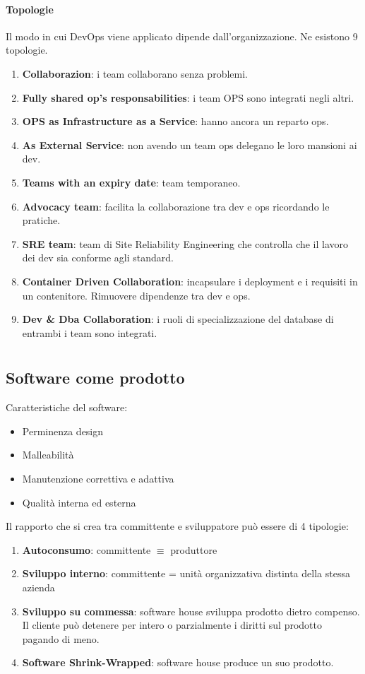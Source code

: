 \documentclass{report}
\begin{document}
\subsubsection*{Topologie}
Il modo in cui DevOps viene applicato dipende dall'organizzazione. Ne esistono 9 topologie.
\begin{enumerate}
    \item \textbf{Collaborazion}: i team collaborano senza problemi.
    \item \textbf{Fully shared op's responsabilities}: i team OPS sono integrati negli altri.
    \item \textbf{OPS as Infrastructure as a Service}: hanno ancora un reparto ops.
    \item \textbf{As External Service}: non avendo un team ops delegano le loro mansioni ai dev.
    \item \textbf{Teams with an expiry date}: team temporaneo.
    \item \textbf{Advocacy team}: facilita la collaborazione tra dev e ops ricordando le pratiche.
    \item \textbf{SRE team}: team di Site Reliability Engineering che controlla che il lavoro dei dev sia conforme agli standard.
    \item \textbf{Container Driven Collaboration}: incapsulare i deployment e i requisiti in un contenitore. Rimuovere dipendenze tra dev e ops.
    \item \textbf{Dev \& Dba Collaboration}: i ruoli di specializzazione del database di entrambi i team sono integrati.
\end{enumerate}

\chapter{}
\section{Software come prodotto}
Caratteristiche del software:
\begin{itemize}
    \item Perminenza design
    \item Malleabilità
    \item Manutenzione correttiva e adattiva
    \item Qualità interna ed esterna
\end{itemize}

\noindent
Il rapporto che si crea tra committente e sviluppatore può essere di 4 tipologie:
\begin{enumerate}
    \item \textbf{Autoconsumo}: committente $\equiv$ produttore
    \item \textbf{Sviluppo interno}: committente = unità organizzativa distinta della stessa azienda
    \item \textbf{Sviluppo su commessa}: software house sviluppa prodotto dietro compenso. Il cliente può detenere per intero o parzialmente i diritti sul prodotto pagando di meno.
    \item \textbf{Software Shrink-Wrapped}: software house produce un suo prodotto.
\end{enumerate}
\end{document}
